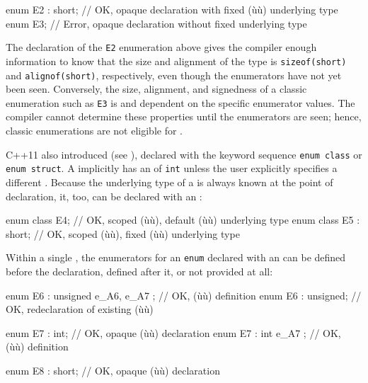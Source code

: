 \begin{emcppslisting}
enum E2 : short;  // OK, opaque declaration with fixed (ù{}ù) underlying type
enum E3;          // Error, opaque declaration without fixed underlying type
\end{emcppslisting}

The declaration of the \lstinline!E2! enumeration above gives the compiler enough information to know that the size and alignment of the type is \lstinline!sizeof(short)! and \lstinline!alignof(short)!, respectively, even though the enumerators have not yet been seen.  Conversely, the size, alignment, and signedness of a classic enumeration such as \lstinline!E3! is  and dependent on the specific enumerator values. The compiler cannot determine these properties until the enumerators are seen; hence, classic enumerations are not eligible for .

C++11 also introduced  (see ), declared with the keyword sequence \lstinline!enum!~\lstinline!class! or \lstinline!enum!~\lstinline!struct!.  A  implicitly has an  of \lstinline!int! unless the user explicitly specifies a different .  Because the underlying type of a  is always known at the point of declaration, it, too, can be declared with an :

\begin{emcppslisting}
enum class E4;          // OK, scoped (ù{}ù), default (ù{}ù) underlying type
enum class E5 : short;  // OK, scoped (ù{}ù), fixed (ù{}ù) underlying type
\end{emcppslisting}

Within a single , the enumerators for an \lstinline!enum! declared with an  can be defined before the declaration, defined after it, or not provided at all:

\begin{emcppslisting}
enum E6 : unsigned { e_A6, e_A7 };  // OK, (ù{}ù) definition
enum E6 : unsigned;                 // OK, redeclaration of existing (ù{}ù)

enum E7 : int;                      // OK, opaque (ù{}ù) declaration
enum E7 : int { e_A7 };             // OK, (ù{}ù) definition

enum E8 : short;                    // OK, opaque (ù{}ù) declaration
\end{emcppslisting}

